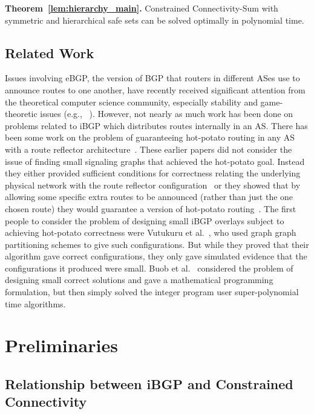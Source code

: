 \documentclass[11pt,letterpaper]{article}
\theoremstyle{definition}
\begin{document}
{\bf Theorem~\ref{lem:hierarchy_main}.}\hspace{.01in}
  {\sc Constrained Connectivity-Sum} with symmetric and hierarchical safe sets can
  be solved optimally in polynomial time.

\subsection{Related Work}
Issues involving eBGP, the version of BGP that routers in different ASes use
to announce routes to one another, have recently received
significant attention from the theoretical computer science community,
especially stability and game-theoretic issues
(e.g., ~\cite{griffin:02,levin:08,fabrikant:08}).
However, not nearly as much work has
been done on problems related to iBGP which distributes routes
internally in an AS.
There has been some work on the problem of guaranteeing
hot-potato routing in any AS with a route reflector
architecture~\cite{rfc:2796}.
These earlier papers did not consider the issue of
finding small signaling graphs that achieved the hot-potato goal.
Instead they either provided sufficient conditions for correctness
relating the underlying physical network with the route
reflector configuration~\cite{griffinwilfong:2002a} or they showed
that by allowing some specific extra routes to be announced (rather
than just the one chosen route) they would guarantee a version of
hot-potato routing~\cite{basu}.
The first people to consider the problem of
designing small iBGP overlays subject to achieving hot-potato
correctness were Vutukuru et al.~\cite{vutukuru:06}, who used graph
graph partitioning schemes to give such configurations.  But while
they proved that their algorithm gave correct configurations, they
only gave simulated evidence that the configurations it produced were
small.  Buob et
al.~\cite{buob:08} considered the problem of designing small correct
solutions and gave a mathematical programming formulation, but
then simply solved the integer program user super-polynomial time
algorithms.

\section{Preliminaries}

\subsection{Relationship between iBGP and Constrained Connectivity} \label{sec:iBGP_CC}
\end{document}
